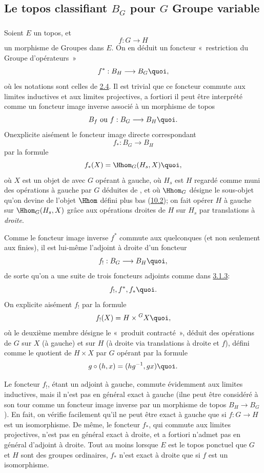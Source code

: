 \documentclass[10pt]{../fichiers-configuration-latex/smfart}
\begin{document}
\subsection{Le topos classifiant $B_G$ pour $G$ Groupe variable}

\subsubsection{}
Soient $E$ un topos, et
$$
f:G\longrightarrow H
$$
un morphisme de Groupes dans $E$. On en déduit un foncteur « restriction du Groupe d'opérateurs »
$$
f^{\ast}:B_H\longrightarrow B_G{\quoi},
$$
où les notations sont celles de \hyperref[IV.subsec2.4]{2.4}. Il est trivial
que ce foncteur commute aux limites inductives et aux limites
projectives, a fortiori il peut être interprété comme un
foncteur image inverse associé à un morphisme de topos
$$
B_f\mbox{ ou } f:B_G\longrightarrow B_H{\quoi}.
$$
On\pageoriginale explicite aisément le foncteur image directe
correspondant
$$
f_{\ast}:B_G\longrightarrow B_H
$$
par la formule
$$
f_{\ast}(X)=\Hhom_G(H_s,X){\quoi},
$$
où $X$ est un objet de  avec $G$ opérant à gauche, où
$H_s$ est $H$ regardé comme muni des opérations à gauche par
$G$ déduites de , et où $\Hhom_G$ désigne le sous-objet
qu'on devine de l'objet $\Hhom$ défini plus bas (\hyperref[IV.subsec10.2]{10.2}); on fait
opérer $H$ à gauche sur $\Hhom_G(H_s,X)$ grâce aux
opérations droites de $H$ sur $H_s$ par translations à
\emph{droite}.

Comme le foncteur image inverse $f^{\ast}$ commute aux \sisi{$\varinjlim$}{$\varprojlim$}
quelconques (et non seulement aux \sisi{$\varinjlim$}{$\varprojlim$} finies), il est
lui-même l'adjoint à droite d'un foncteur
$$
f_{!}:B_G\longrightarrow B_H{\quoi},
$$
de sorte qu'on a une suite de trois foncteurs adjoints comme dans
\hyperref[IV.subsubsec3.1.3]{3.1.3}:
$$
f_{!},f^{\ast}, f_{\ast}{\quoi}.
$$
On explicite aisément $f_{!}$ par la formule
$$
f_{!}(X)=H\times {}^GX{\quoi},
$$
où le deuxième membre désigne le « produit contracté »,
déduit des opérations de $G$ sur $X$ (à gauche) et sur $H$
(à droite via translations à droite et $f$), défini comme le
quotient de $H\times X$ par $G$ opérant par la formule
$$
g\circ (h,x)=(hg^{-1}, gx){\quoi}.
$$

Le foncteur $f_{!}$, étant un adjoint à gauche, commute
évidemment aux limites inductives, mais il n'est pas en
général exact à gauche (\ie il\pageoriginale ne peut être
considéré à son tour comme un foncteur image inverse par un
morphisme de topos $B_H\rightarrow B_G$). En fait, on vérifie
facilement qu'il ne peut être exact à gauche que si
$f:G\rightarrow H$ est un isomorphisme. De même, le foncteur
$f_{\ast}$, qui commute aux limites projectives, n'est pas en
général exact à droite, et a fortiori n'admet pas en
général d'adjoint à droite. Tout au moins lorsque $E$ est le
topos ponctuel \ie que $G$ et $H$ sont des groupes ordinaires,
$f_{\ast}$ n'est exact à droite que si $f$ est un isomorphisme.
\end{document}
